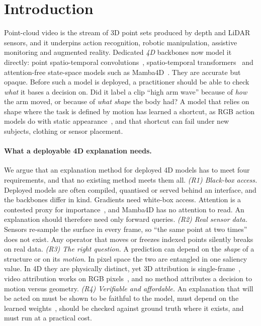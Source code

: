 
\section{Introduction}
\label{sec:intro}

Point-cloud video is the stream of 3D point sets produced by depth and LiDAR sensors, and it underpins action recognition, robotic manipulation, assistive monitoring and augmented reality. Dedicated \emph{4D} backbones now model it directly: point spatio-temporal convolutions~\cite{fan2021pstnet}, spatio-temporal transformers~\cite{fan2021p4transformer} and attention-free state-space models such as Mamba4D~\cite{liu2025mamba4d}. They are accurate but opaque. Before such a model is deployed, a practitioner should be able to check \emph{what} it bases a decision on. Did it label a clip ``high arm wave'' because of \emph{how} the arm moved, or because of \emph{what shape} the body had? A model that relies on shape where the task is defined by motion has learned a shortcut, as RGB action models do with static appearance~\cite{li2023staticbias}, and that shortcut can fail under new subjects, clothing or sensor placement.

\paragraph{What a deployable 4D explanation needs.}
We argue that an explanation method for deployed 4D models has to meet four requirements, and that no existing method meets them all.
\emph{(R1) Black-box access.} Deployed models are often compiled, quantised or served behind an interface, and the backbones differ in kind. Gradients need white-box access. Attention is a contested proxy for importance~\cite{jain2019attention,abnar2020rollout}, and Mamba4D has no attention to read. An explanation should therefore need only forward queries.
\emph{(R2) Real sensor data.} Sensors re-sample the surface in every frame, so ``the same point at two times'' does not exist. Any operator that moves or freezes indexed points silently breaks on real data.
\emph{(R3) The right question.} A prediction can depend on the \emph{shape} of a structure or on its \emph{motion}. In pixel space the two are entangled in one saliency value. In 4D they are physically distinct, yet 3D attribution is single-frame~\cite{zheng2019pointcloudsaliency,schinagl2022occam}, video attribution works on RGB pixels~\cite{price2020playfair,lee2025dance}, and no method attributes a decision to motion versus geometry.
\emph{(R4) Verifiable and affordable.} An explanation that will be acted on must be shown to be faithful to the model, must depend on the learned weights~\cite{adebayo2018sanity}, should be checked against ground truth where it exists, and must run at a practical cost.

